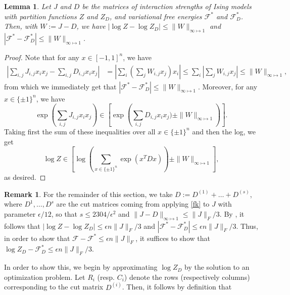 \documentclass[final, 12pt]{colt2018}
\newcommand{\F}{\mathcal{F}}
\newtheorem{lemma}[theorem]{Lemma}
\theoremstyle{definition}
\newtheorem{remark}[theorem]{Remark}
\theoremstyle{plain}
\begin{document}
\begin{lemma}
\label{lemma: free-energy-lipschitz} 
Let $J$ and $D$ be the matrices of interaction strengths of 
Ising models with partition functions $Z$ and $Z_{D}$, and variational free energies $\F^{*}$ and $\F^{*}_{D}$. Then, with $W:= J - D$, we have  
$|\log Z-\log Z_{D}|\leq \|W\|_{\infty \mapsto 1}$ and $|\F^{*}-\F^{*}_{D}|\leq\|W\|_{\infty \mapsto 1}$. 
\end{lemma}
\begin{proof}
Note that for any $x\in[-1,1]^{n}$, we have 
\begin{align*}
|\sum_{i,j}J_{i,j}x_{i}x_{j}-\sum_{i,j}D_{i,j}x_{i}x_{j}| & =|\sum_{i}(\sum_{j}W_{i,j}x_{j})x_{i}| \leq \sum_{i}|\sum_{j}W_{i,j}x_{j}|
 \leq\|W\|_{\infty\mapsto1}, 
\end{align*}
from which we immediately get that $|\F^{*}-\F^{*}_{D}|\leq\|W\|_{\infty \mapsto 1}$. 
Moreover, for any $x\in\{\pm1\}^{n}$, we have 
\[
\exp\left(\sum_{i,j}J_{i,j}x_{i}x_{j}\right) \in \left[ \exp\left(\sum_{i,j}D_{i,j}x_{i}x_{j}) \pm \|W\|_{\infty \mapsto 1}\right) \right].
\]
Taking first the sum of these inequalities over all $x\in\{\pm1\}^{n}$
and then the log, we get 
\[
\log Z \in \left[ \log\left(\sum_{x\in\{\pm1\}^{n}}\exp \left(x^{T}Dx \right)\right) \pm \|W\|_{\infty \mapsto 1} \right],
\]
as desired. 
\end{proof}
\begin{remark}
\label{rmk:applying-regularity-structural-result}
For the remainder of this section, we take $D:=D^{(1)}+\dots+D^{(s)}$, where $D^{1},\dots,D^{s}$ are the cut matrices coming from applying \cref{fk} to $J$ with parameter $\epsilon/12$, so that $s \le 2304/\epsilon^2$ and $\|J - D\|_{\infty \mapsto 1} \le \|J\|_F/3$. By , it follows that $|\log Z -\log Z_{D}|\leq \epsilon n\|J\|_F/3$ and $|\F^{*}-\F^{*}_{D}|\leq \epsilon n\|J\|_F/3 $. Thus, in order to show that $\F - \F^{*} \leq \epsilon n\|J\|_F$, it suffices to show that $\log Z_D - \F^{*}_D \leq \epsilon n\|J\|_F/3$. 
\end{remark}

In order to show this, we begin by approximating $\log Z_{D}$ by the solution to an optimization problem. Let 
$R_{i}$ (resp. $C_{i}$) denote the rows (respectively columns) corresponding
to the cut matrix $D^{(i)}$. Then,
it follows by definition that
\end{document}
